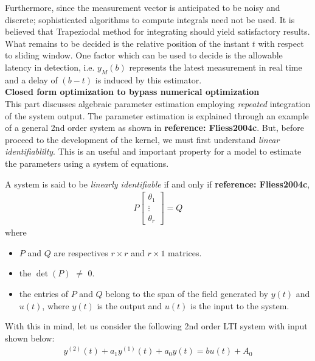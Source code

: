 \documentclass{article}
\begin{document}
Furthermore, since the measurement vector is anticipated to be noisy and discrete; sophisticated algorithms to compute integrals need not be used. It is believed that Trapeziodal method for integrating should yield satisfactory results. What remains to be decided is the relative position of the instant $t$ with respect to sliding window. One factor which can be used to decide is the allowable latency in detection, i.e. $y_M(b)$ represents the latest measurement in real time and a delay of $(b-t)$ is induced by this estimator.
\\ \textbf{Closed form optimization to bypass numerical optimization}\\
This part discusses algebraic parameter estimation employing \textit{repeated} integration of the system output. The parameter estimation is explained through an example of a general 2nd order system as shown in \textbf{reference: Fliess2004c}. But, before proceed to the development of the kernel, we must first understand \textit{linear identifiablilty}. This is an useful and important property for a model to estimate the parameters using a system of equations.
\par A system is said to be \textit{linearly identifiable} if and only if \textbf{reference: Fliess2004c}, 
\begin{equation}\label{eqn.28.1}
\begin{split}
P\begin{bmatrix} \theta_1 \\ \vdots \\ \theta_r \end{bmatrix} = Q
\end{split}
\end{equation}
where
\begin{itemize}
\item $P$ and $Q$ are respectives $r \times r$ and $r \times 1$ matrices.
\item the $\det(P)$ $\neq$ $0$. 
\item the entries of $P$ and $Q$ belong to the span of the field generated by $y(t)$ and $u(t)$, where $y(t)$ is the output and $u(t)$ is the input to the system.
\end{itemize}
With this in mind, let us consider the following 2nd order LTI system with input shown below:
\begin{equation}\label{eqn.29}
\begin{split}
y^{(2)}(t)+a_{1}y^{(1)}(t)+a_{0}y(t) = b u(t) +A_{0}
\end{split}
\end{equation}
\end{document}
